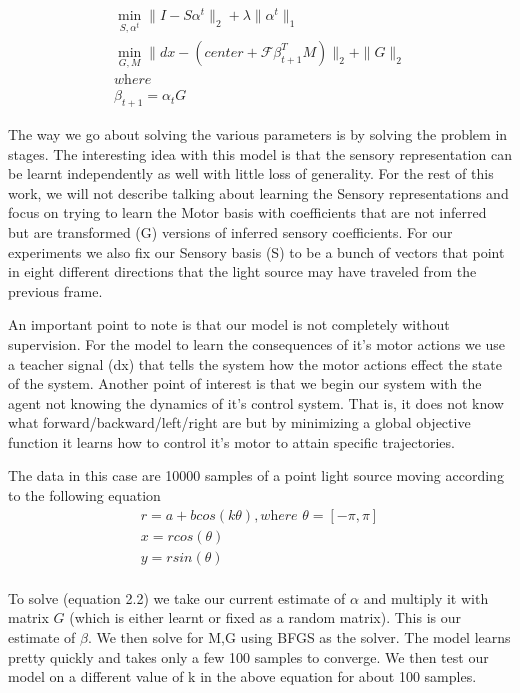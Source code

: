 \documentclass[conference]{IEEEtran}
\begin{document}
\begin{eqnarray}
\min_{S,\alpha^{t}} \| I - S\alpha^{t} \|_{2} + \lambda \| \alpha^{t} \|_{1}\\
\min_{G,M}  \| dx - (center + \mathcal{F} \beta_{t+1}^{T}M ) \|_{2} + \|G \|_{2}\\
\textit{where}\\
\beta_{t+1} = \alpha_{t} G
\end{eqnarray}


The way we go about solving the various parameters is by solving the problem in stages. The interesting idea with this model is that the sensory representation can be learnt independently as well with little loss of generality. For the rest of this work, we will not describe talking about learning the Sensory representations and focus on trying to learn the Motor basis with coefficients that are not inferred but are transformed (G) versions of inferred sensory coefficients. For our experiments we also fix our Sensory basis (S) to be a bunch of vectors that point in eight different directions that the light source may have traveled from the previous frame.

An important point to note is that our model is not completely without supervision. For the model to learn the consequences of it's motor actions we use a teacher signal (dx) that tells the system how the motor actions effect the state of the system. Another point of interest is that we begin our system with the agent not knowing the dynamics of it's control system. That is, it does not know what forward/backward/left/right are but by minimizing a global objective function it learns how to control it's motor to attain specific trajectories. 

The data in this case are 10000 samples of a point light source moving according to the following equation 
\begin{eqnarray}
r = a + b cos(k \theta),\textit{where } \theta = [ -\pi, \pi ] \\
x = r cos(\theta)\\
y = r sin(\theta)\\
\end{eqnarray}

To solve (equation 2.2) we take our current estimate of $\alpha$ and multiply it with matrix $G$ (which is either learnt or fixed as a random matrix). This is our estimate of $\beta$. We then solve for M,G using BFGS as the solver. The model learns pretty quickly and takes only a few 100 samples to converge. We then test our model on a different value of k in the above equation for about 100 samples.
\end{document}
